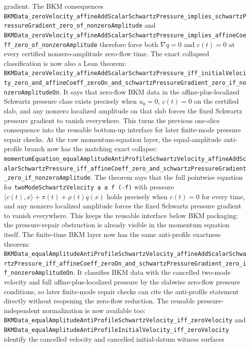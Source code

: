 \documentclass[11pt]{article}
\theoremstyle{remark}
\begin{document}
gradient.  The BKM consequences
\texttt{BKMData\_zeroVelocity\_affineAddScalarSchwartzPressure\_implies\_schwartzPressureGradient\_zero\_of\_nonzeroAmplitude}
and
\texttt{BKMData\_zeroVelocity\_affineAddScalarSchwartzPressure\_implies\_affineCoeff\_zero\_of\_nonzeroAmplitude}
therefore force both \(\nabla q=0\) and \(c(t)=0\) at every certified
nonzero-amplitude zero-flow time.
The exact collapsed classification is now also a Lean theorem:
\texttt{BKMData\_zeroVelocity\_affineAddScalarSchwartzPressure\_iff\_initialVelocity\_zero\_and\_affineCoeff\_zeroOn\_and\_schwartzPressureGradient\_zero\_if\_nonzeroAmplitudeOn}.
It says that zero-flow BKM data in the affine-plus-localized Schwartz pressure
class exists precisely when \(u_0=0\), \(c(t)=0\) on the certified slab, and
any nonzero localized amplitude on that slab forces the fixed Schwartz
pressure gradient to vanish everywhere.  This turns the previous one-slice
consequence into the reusable bottom-up interface for later finite-mode
pressure repair checks.
At the raw momentum-equation layer, the equal-amplitude anti-profile branch now
has the matching exact collapse:
\texttt{momentumEquation\_equalAmplitudeAntiProfileSchwartzVelocity\_affineAddScalarSchwartzPressure\_iff\_affineCoeff\_zero\_and\_schwartzPressureGradient\_zero\_if\_nonzeroAmplitude}.
The theorem says that the full pointwise equation for
\texttt{twoModeSchwartzVelocity a a f (-f)} with pressure
\(\langle c(t),x\rangle+\pi(t)+\rho(t)q(x)\) holds precisely when \(c(t)=0\)
for every time, and any nonzero localized amplitude forces the fixed Schwartz
pressure gradient to vanish everywhere.  This keeps the reusable interface
below BKM packaging: the pressure-repair obstruction is already visible in the
momentum equation itself.
The finite-time BKM layer now has the same anti-profile exactness theorem:
\texttt{BKMData\_equalAmplitudeAntiProfileSchwartzVelocity\_affineAddScalarSchwartzPressure\_iff\_affineCoeff\_zeroOn\_and\_schwartzPressureGradient\_zero\_if\_nonzeroAmplitudeOn}.
It classifies BKM data with the cancelled two-mode velocity and full
affine-plus-localized pressure by the slabwise zero-flow pressure conditions,
so later finite-mode repair checks can cite the anti-profile statement directly
without reopening the zero-flow reduction.
The reusable pressure-independent normalization is now available too:
\texttt{BKMData\_equalAmplitudeAntiProfileSchwartzVelocity\_iff\_zeroVelocity}
and
\texttt{BKMData\_equalAmplitudeAntiProfileInitialVelocity\_iff\_zeroVelocity}
identify the cancelled velocity and cancelled initial-datum witness surfaces
\end{document}
